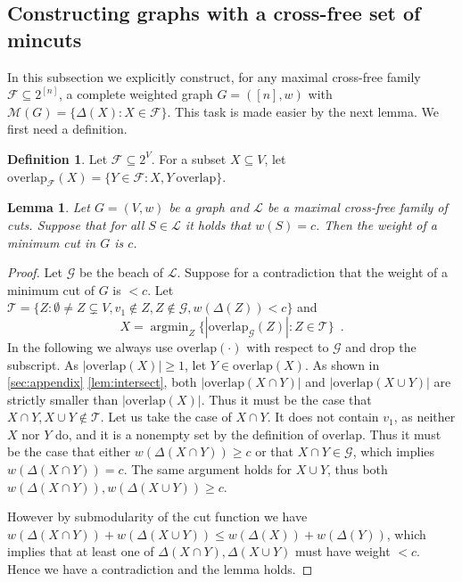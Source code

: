 \documentclass[10pt,a4paper]{article}
\newcommand{\Lcal}{\mathcal{L}}
\newcommand{\M}{\mathcal{M}}
\newcommand{\Tcal}{\mathcal{T}}
\newcommand{\Fcal}{\mathcal{F}}
\newcommand{\Gcal}{\mathcal{G}}
\DeclareMathOperator*{\argmin}{argmin}
\newcommand{\cross}{\mathrm{overlap}}
\newcommand{\1}{\mathbf{1}}
\newtheorem{lemma}[theorem]{Lemma}
\theoremstyle{definition}
\newtheorem{definition}[theorem]{Definition}
\begin{document}
\subsection{Constructing graphs with a cross-free set of mincuts}
\label{subsec:construction}
In this subsection we explicitly construct, for any maximal cross-free family $\Fcal \subseteq 2^{[n]}$, a complete weighted graph $G = ([n],w)$
with $\M(G) = \{ \Delta(X) : X \in \Fcal\}$.  This task is made easier by the next lemma.  We first need a definition.

\begin{definition}
\label{def:overlap}
Let $\Fcal \subseteq 2^{V}$.  For a subset $X \subseteq V$, let $\cross_{\Fcal}(X) = \{Y \in \Fcal: X, Y \ \cross\}$.
\end{definition}

\begin{lemma}
\label{lem:min_value}
Let $G = (V,w)$ be a graph and $\Lcal$ be a maximal cross-free family of cuts.  Suppose that for all
$S \in \Lcal$ it holds that $w(S) = c$.  Then the weight of a minimum cut in $G$ is $c$.
\end{lemma}

\begin{proof}
Let $\Gcal$ be the beach of $\Lcal$.  Suppose for a contradiction that the weight of a minimum cut of $G$ is $< c$.
Let $\Tcal = \{ Z : \emptyset \ne Z \subsetneq V, v_1 \not \in Z, Z \not \in \Gcal, w(\Delta(Z)) < c\}$ and
\[
X = \argmin_{Z} \{|\cross_\Gcal(Z)|: Z \in \Tcal \} \enspace .
\]
In the following we always use $\cross(\cdot)$ with respect to $\Gcal$ and
drop the subscript.  As $|\cross(X)| \ge 1$, let $Y \in \cross(X)$.  As shown in \cref{sec:appendix} \cref{lem:intersect}, both
$|\cross(X \cap Y)|$ and $|\cross(X \cup Y)|$ are strictly smaller than $|\cross(X)|$.  Thus it must be the case that
$X \cap Y, X \cup Y \not \in \Tcal$.  Let us take the case of $X \cap Y$.  It does not contain $v_1$, as neither $X$ nor $Y$ do,
and it is a nonempty set by the definition of $\cross$.  Thus it must be the case that either $w(\Delta(X \cap Y)) \ge c$ or
that $X \cap Y \in \Gcal$, which implies $w(\Delta(X \cap Y)) = c$.  The same argument holds for $X \cup Y$, thus
both $w(\Delta(X \cap Y)), w(\Delta(X \cup Y)) \ge c$.

However by submodularity of the cut function we have
$w(\Delta(X\cap Y )) + w(\Delta(X \cup Y)) \le w(\Delta(X)) + w(\Delta(Y))$, which implies that at least one of $\Delta(X \cap Y), \Delta(X \cup Y)$ must have weight $<c$.
Hence we have a contradiction and the lemma holds.
\end{proof}
\end{document}
